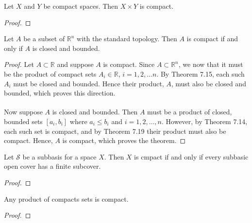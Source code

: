 \documentclass[a4paper,12pt,twoside]{hmcpset}
\begin{document}
\begin{problem}[Theorem 7.19] Let $X$ and $Y$ be compact spaces. Then
    $X \times Y$ is compact.
\end{problem}

\begin{proof}
    
\end{proof}

\begin{problem} 
    Let $A$ be a subset of $\mathbb{R}^n$ with the standard topology.
    Then $A$ is compact if and only if $A$ is closed and bounded.
\end{problem}

\begin{proof}
    Let $A \subset \mathbb{R}$ and suppose $A$ is compact. Since $A
    \subset \mathbb{R}^n$, we now that it must be the product of
    compact sets $A_i \in \mathbb{R}$, $i = 1, 2, \dots n$. By Theorem
    7.15, each such $A_i$ must be closed and bounded. Hence their
    product, $A$, must also be closed and bounded, which proves this
    direction.
    \\
    \\
    Now suppose $A$ is closed and bounded. Then $A$ must be a product of
    closed, bounded sets $[a_i, b_i]$ where $a_i \le b_i$ and 
    $i = 1, 2, \dots, n$. However, by Theorem 7.14, each such set is
    compact, and by Theorem 7.19 their product must also be compact.
    Hence, $A$ is compact, which proves the theorem.
    
\end{proof}

\begin{problem}
    Let $\mathcal{S}$ be a subbasis for a space $X$. Then $X$ is
    cmpact if and only if every subbasic open cover has a finite
    subcover. 
\end{problem}

\begin{proof}
    
\end{proof}

\begin{problem}
    Any product of compacts sets is compact.
\end{problem}

\begin{proof}
    
\end{proof}
\end{document}
